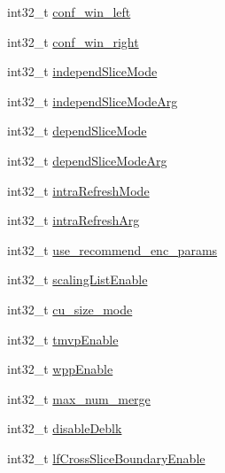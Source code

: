 \begin{DoxyCompactItemize}
\item 
int32\+\_\+t \mbox{\hyperlink{struct__ni__t408__config__t_a861b75deb87d0311ab713c372a89c3db}{conf\+\_\+win\+\_\+left}}
\item 
int32\+\_\+t \mbox{\hyperlink{struct__ni__t408__config__t_a997a7dfa78ea00ad507e5602b591d18e}{conf\+\_\+win\+\_\+right}}
\item 
int32\+\_\+t \mbox{\hyperlink{struct__ni__t408__config__t_a30a01a8c46d70e118ff75abc8b5e3014}{independ\+Slice\+Mode}}
\item 
int32\+\_\+t \mbox{\hyperlink{struct__ni__t408__config__t_a5410e44e3af2b66682101df91d419bc0}{independ\+Slice\+Mode\+Arg}}
\item 
int32\+\_\+t \mbox{\hyperlink{struct__ni__t408__config__t_ab8e0ef7bdea29cbeb8cafb61dab9c65a}{depend\+Slice\+Mode}}
\item 
int32\+\_\+t \mbox{\hyperlink{struct__ni__t408__config__t_a418194649eee2e58f35a84e155b9d02f}{depend\+Slice\+Mode\+Arg}}
\item 
int32\+\_\+t \mbox{\hyperlink{struct__ni__t408__config__t_a653491351aa4ed441635561e032455b8}{intra\+Refresh\+Mode}}
\item 
int32\+\_\+t \mbox{\hyperlink{struct__ni__t408__config__t_aac7eb3b757e665e9be99a2886571a556}{intra\+Refresh\+Arg}}
\item 
int32\+\_\+t \mbox{\hyperlink{struct__ni__t408__config__t_a4aa8986f4bf148ab355ba99240e45053}{use\+\_\+recommend\+\_\+enc\+\_\+params}}
\item 
int32\+\_\+t \mbox{\hyperlink{struct__ni__t408__config__t_a873d55ac2de5582c0ada6e56bac05b55}{scaling\+List\+Enable}}
\item 
int32\+\_\+t \mbox{\hyperlink{struct__ni__t408__config__t_af6b8481b13c45b02c51831e2b53dcfdf}{cu\+\_\+size\+\_\+mode}}
\item 
int32\+\_\+t \mbox{\hyperlink{struct__ni__t408__config__t_a3b1348fb2071103ae7f31807e5d73ffd}{tmvp\+Enable}}
\item 
int32\+\_\+t \mbox{\hyperlink{struct__ni__t408__config__t_a869f52b6d5d81b354874776365772d9a}{wpp\+Enable}}
\item 
int32\+\_\+t \mbox{\hyperlink{struct__ni__t408__config__t_a3e28a1e79bff6d88d16170c3d1006686}{max\+\_\+num\+\_\+merge}}
\item 
int32\+\_\+t \mbox{\hyperlink{struct__ni__t408__config__t_a7c82aec867ab070248f2e6135071b680}{disable\+Deblk}}
\item 
int32\+\_\+t \mbox{\hyperlink{struct__ni__t408__config__t_a5855f5f4dc4bfe206ecde7aec5359450}{lf\+Cross\+Slice\+Boundary\+Enable}}

\end{DoxyCompactItemize}

